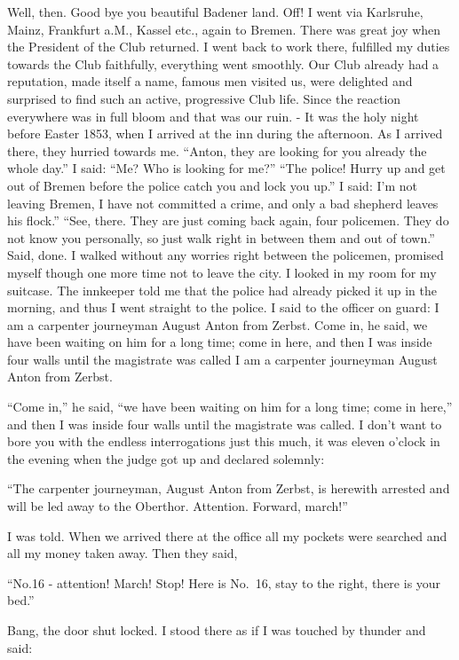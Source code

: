 Well, then. Good bye you beautiful Badener land. Off! I went via Karlsruhe, Mainz, Frankfurt a.M., Kassel etc., again to Bremen. There was great joy when the President of the Club returned. I went back to work there, fulfilled my duties towards the Club faithfully, everything went smoothly. Our Club already had a reputation, made itself a name, famous men visited us, were delighted and surprised to find such an active, progressive Club life. Since the reaction everywhere was in full bloom and that was our ruin. - It was the holy night before Easter 1853, when I arrived at the inn during the afternoon. As I arrived there, they hurried towards me. ``Anton, they are looking for you already the whole day.'' I said: ``Me? Who is looking for me?'' ``The police! Hurry up and get out of Bremen before the police catch you and lock you up.'' I said: I'm not leaving Bremen, I have not committed a crime, and only a bad shepherd leaves his flock.'' ``See, there. They are just coming back again, four policemen. They do not know you personally, so just walk right in between them and out of town.'' Said, done. I walked without any worries right between the policemen, promised myself though one more time not to leave the city. I looked in my room for my suitcase. The innkeeper told me that the police had already picked it up in the morning, and thus I went straight to the police. I said to the officer on guard: I am a carpenter journeyman August Anton from Zerbst. Come in, he said, we have been waiting on him for a long time; come in here, and then I was inside four walls until the magistrate was called I am a carpenter journeyman August Anton from Zerbst.

``Come in,'' he said, ``we have been waiting on him for a long time; come in here,'' and then I was inside four walls until the magistrate was called. I don't want to bore you with the endless interrogations just this much, it was eleven o'clock in the evening when the judge got up and declared solemnly:

``The carpenter journeyman, August Anton from Zerbst, is herewith arrested and will be led away to the Oberthor. Attention. Forward, march!''

I was told. When we arrived there at the office all my pockets were searched and all my money taken away. Then they said,

``No.16 - attention! March! Stop! Here is No.~16, stay to the right, there is your bed.''

Bang, the door shut locked. I stood there as if I was touched by thunder and said:

